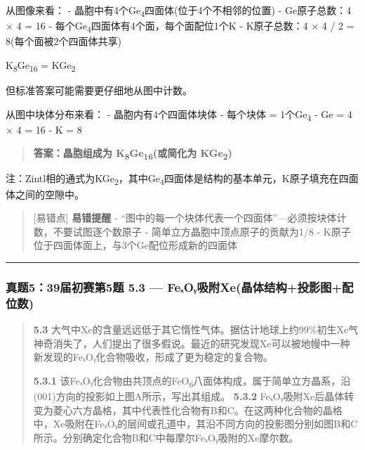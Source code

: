 \documentclass[a4paper,11pt]{ctexart}
\newcommand{\箭}{\ensuremath{\rightarrow}}
\newcommand{\左箭}{\ensuremath{\leftarrow}}
\newcommand{\上箭}{\ensuremath{\uparrow}}
\newcommand{\下箭}{\ensuremath{\downarrow}}
\newcommand{\衡}{\ensuremath{\rightleftharpoons}}
\newcommand{\双箭}{\ensuremath{\leftrightarrow}}
\newcommand{\约等于}{\ensuremath{\approx}}
\newcommand{\小于等于}{\ensuremath{\leq}}
\newcommand{\大于等于}{\ensuremath{\geq}}
\newcommand{\不等于}{\ensuremath{\neq}}
\newcommand{\西格马}{\ensuremath{\sigma}}
\newcommand{\派}{\ensuremath{\pi}}
\begin{document}
从图像来看：
- 晶胞中有4个Ge\textsubscript{4}四面体(位于4个不相邻的位置)
- Ge原子总数：4 × 4 = 16
- 每个Ge\textsubscript{4}四面体有4个面，每个面配位1个K
- K原子总数：4 × 4 / 2 = 8(每个面被2个四面体共享)

K\textsubscript{8}Ge\textsubscript{16} = KGe\textsubscript{2}

但标准答案可能需要更仔细地从图中计数。

从图中块体分布来看：
- 晶胞内有4个四面体块体
- 每个块体 = 1个Ge\textsubscript{4}
- Ge = 4 × 4 = 16
- K = 8

\begin{quote}
\textbf{答案：晶胞组成为 K\textsubscript{8}Ge\textsubscript{16}(或简化为 KGe\textsubscript{2})}
\end{quote}

注：Zintl相的通式为KGe\textsubscript{2}，其中Ge\textsubscript{4}四面体是结构的基本单元，K原子填充在四面体之间的空隙中。

\begin{quote}
{[}易错点{]} \textbf{易错提醒}
- ``图中的每一个块体代表一个四面体''---必须按块体计数，不要试图逐个数原子
- 简单立方晶胞中顶点原子的贡献为1/8
- K原子位于四面体面上，与3个Ge配位形成新的四面体
\end{quote}

\begin{center}\rule{0.5\linewidth}{0.5pt}\end{center}

\subsubsection{真题5：39届初赛第5题 5.3 --- FeₓOᵧ吸附Xe(晶体结构+投影图+配位数)}\label{ux771fux9898539ux5c4aux521dux8d5bux7b2c5ux9898-5.3-feux2093oux1d67ux5438ux9644xeux6676ux4f53ux7ed3ux6784ux6295ux5f71ux56feux914dux4f4dux6570}

\begin{quote}
\textbf{5.3} 大气中Xe的含量远远低于其它惰性气体。据估计地球上约99\%初生Xe气神奇消失了，人们提出了很多假说。最近的研究发现Xe可以被地幔中一种新发现的FeₓOᵧ化合物吸收，形成了更为稳定的复合物。

\textbf{5.3.1} 该FeₓOᵧ化合物由共顶点的FeO\textsubscript{6}八面体构成，属于简单立方晶系，沿(001)方向的投影如上图A所示，写出其组成。
\textbf{5.3.2} FeₓOᵧ吸附Xe后晶体转变为菱心六方晶格，其中代表性化合物有B和C。在这两种化合物的晶格中，Xe吸附在FeₓOᵧ的层间或孔道中，其沿不同方向的投影图分别如图B和C所示。分别确定化合物B和C中每摩尔FeₓOᵧ吸附的Xe摩尔数。
\end{quote}
\end{document}
